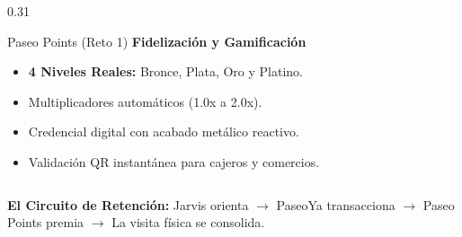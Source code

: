 \documentclass[aspectratio=169, 10pt]{beamer}
\begin{document}
\begin{frame}
\begin{columns}[T]
    \begin{column}{0.31\textwidth}
      \begin{exampleblock}{Paseo Points (Reto 1)}
        \scriptsize
        \textbf{Fidelización y Gamificación}
        \begin{itemize}\setlength\itemsep{0.25em}
          \item \textbf{4 Niveles Reales:} Bronce, Plata, Oro y Platino.
          \item Multiplicadores automáticos (1.0x a 2.0x).
          \item Credencial digital con acabado metálico reactivo.
          \item Validación QR instantánea para cajeros y comercios.
        \end{itemize}
      \end{exampleblock}
    \end{column}
  \end{columns}

  \vskip 0.35cm
  \centering
  \color{AranjuezGold}\footnotesize \textbf{El Circuito de Retención:} Jarvis orienta $\rightarrow$ PaseoYa transacciona $\rightarrow$ Paseo Points premia $\rightarrow$ La visita física se consolida.
\end{frame}
\end{document}
